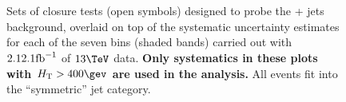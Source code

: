 \clearpage
\begin{figure}[h!]
  \begin{center}
     ~~
     \\
     ~~
     \\
    \caption{Sets of closure tests (open symbols) designed to probe
      the \znunu + jets background, overlaid on top of
      the systematic uncertainty estimates for each of the seven
      \scalht bins (shaded bands) carried out with $2.12.1\ifb$ of
      $13\tev$ data. {\bf Only systematics in these plots with
      $\scalht>400\gev$ are used in the analysis.} All events fit 
      into the ``symmetric'' jet
      category.}
    \label{fig:ZinvclosureDataSymgt400}
  \end{center} 
\end{figure}

